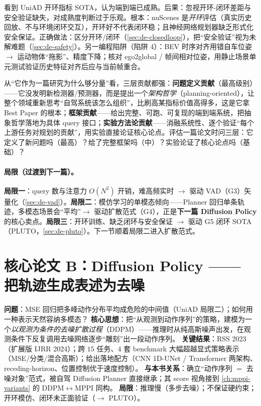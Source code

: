 \begin{pitfall}
看到 UniAD 开环指标 SOTA，认为端到端已成熟。后果：忽视开环-闭环差距与安全验证缺失，对成熟度判断过于乐观。根本：nuScenes 是\emph{开环}评估（真实历史回放、不与环境闭环交互），开环好不代表闭环稳；且神经网络规划器缺乏形式化安全保证。正确做法：区分开环/闭环（\cref{sec:de-closedloop}），把“安全验证”视为未解难题（\cref{sec:de-safety}）。另一编程陷阱（陷阱 4）：BEV 时序对齐用错自车位姿 $\to$ 运动物体“拖影”、精度下降；核对 ego2global / 帧间相对位姿，用静止场景单元测试验证历史特征对齐后应与当前帧重合。
\end{pitfall}

\begin{insight}
从“它作为一篇研究为什么够分量”看，三层贡献都强：\textbf{问题定义贡献}（最高级别）——它没发明新检测器/预测器，而是提出一个\emph{架构哲学}（planning-oriented），让整个领域重新思考“自驾系统该怎么组织”，比刷高某指标价值高得多，这是它拿 Best Paper 的根本；\textbf{框架贡献}——给出完整、可跑、可复现的端到端系统，把抽象哲学落地为具体 query 接口；\textbf{实验方法论贡献}——消融系统性、逐个验证“每个上游任务对规划的贡献”，用实验直接论证核心论点。评估一篇论文时问三层：它定义了新问题吗（最高）？给了完整框架吗（中）？实验论证了核心论点吗（基础）？
\end{insight}

\paragraph{局限（过渡到下一篇）。}
\textbf{局限一}：query 数与注意力 $O(N^2)$ 开销，难高频实时 $\to$ 驱动 VAD（G3）矢量化（\cref{sec:de-vad}）。\textbf{局限二}：模仿学习的单模态倾向——Planner 回归单条轨迹，多模态场景会“平均”$\to$ 驱动扩散范式（G4），正是\textbf{下一篇 Diffusion Policy} 的核心卖点。\textbf{局限三}：开环训练、缺乏闭环与安全保证 $\to$ 驱动 G5 闭环 SOTA（PLUTO，\cref{sec:de-pluto}）。下一节顺着局限二进入扩散范式。

\section{核心论文 B：Diffusion Policy —— 把轨迹生成表述为去噪}
\label{sec:de-dp}

\begin{paper}\label{paper:de-dp}
\textbf{问题}：MSE 回归把多峰动作分布平均成危险的中间值（UniAD 局限二）；如何用一种表示天然容纳多模态？
\textbf{核心思想}\cite{chi2023diffusion}：把“从观测到动作序列”的策略，建模为一个\emph{以观测为条件的去噪扩散过程}（DDPM）——推理时从纯高斯噪声出发，在观测条件下反复调用去噪网络逐步“雕刻”出一段动作序列。
\textbf{关键结果}：RSS 2023（扩展版 IJRR 2024）；跨 $15$ 任务、$4$ 套 benchmark 大幅超越显式策略表示（MSE/分类/混合高斯）；给出落地配方（CNN 1D-UNet / Transformer 两架构、receding-horizon、位置控制优于速度控制）。
\textbf{与本书关系}：确立“动作序列 $=$ 去噪对象”范式，被自驾 Diffusion Planner 直接继承；其 score 视角接到 \cref{ch:mppi-variants} 的 DDPM$\leftrightarrow$MPPI 同构。
\textbf{局限}：推理慢（多步去噪）；不保证硬约束；开环模仿、闭环未正面验证（$\to$ PLUTO）。
\end{paper}

